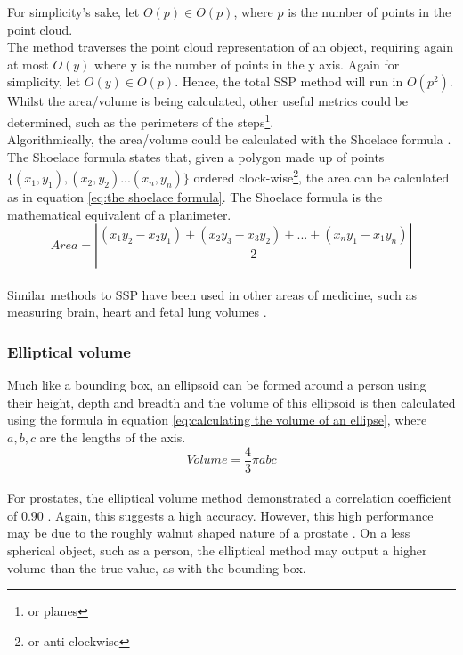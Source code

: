 For simplicity's sake, let $O(p) \in O(p)$, where $p$ is the number of points in the point cloud.\\

The method traverses the point cloud representation of an object, requiring again at most $O(y)$ where y is the number of points in the y axis. Again for simplicity, let $O(y) \in O(p)$. Hence, the total SSP method will run in $O(p^2)$. Whilst the area/volume is being calculated, other useful metrics could be determined, such as the perimeters of the steps\footnote{or planes}.\\

Algorithmically, the area/volume could be calculated with the Shoelace formula \cite{Pretzsch2009}. The Shoelace formula states that, given a polygon made up of points $\{(x_1,y_1),(x_2,y_2)...(x_n,y_n)\}$ ordered clock-wise\footnote{or anti-clockwise}, the area can be calculated as in equation \ref{eq:the shoelace formula}. The Shoelace formula is the mathematical equivalent of a planimeter.\\

\begin{equation}
\label{eq:the shoelace formula}
Area = \left|\frac{(x_1y_2 - x_2y_1) + (x_2y_3 - x_3y_2) + ... + (x_ny_1 - x_1y_n)}{2}\right|
\end{equation}\\

Similar methods to SSP have been used in other areas of medicine, such as measuring brain, heart and fetal lung volumes \cite{Rosen1990,Rypens2001,Graham1971}.\\

\subsubsection{Elliptical volume}
Much like a bounding box, an ellipsoid can be formed around a person using their height, depth and breadth and the volume of this ellipsoid is then calculated using the formula in equation \ref{eq:calculating the volume of an ellipse}, where $a,b,c$ are the lengths of the axis.\\

\begin{equation}
Volume = \frac{4}{3}\pi abc
\label{eq:calculating the volume of an ellipse}
\end{equation}\\

For prostates, the elliptical volume method demonstrated a correlation coefficient of 0.90 \cite{K1991}. Again, this suggests a high accuracy. However, this high performance may be due to the roughly walnut shaped nature of a prostate \cite{D2003}. 
On a less spherical object, such as a person, the elliptical method may output a higher volume than the true value, as with the bounding box.\\

